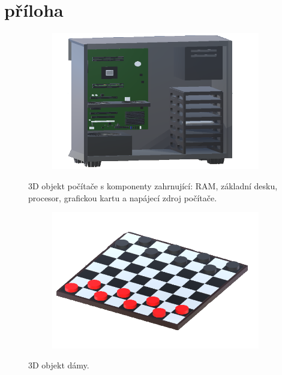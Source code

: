 \documentclass[12pt, a4paper,
twoside,        %
openright
]{report}
\begin{document}
[\vspace{-22pt}] %


\chapter*{příloha}
\begin{figure}[h!] \centering
	\begin{subfigure}[h]{0.63\textwidth}
		\includegraphics[width=\textwidth]{image/pc.png} 
	\end{subfigure}
	\caption[3D objekt počítače]{3D objekt počítače s komponenty zahrnující: RAM, základní desku, procesor, grafickou kartu a napájecí zdroj počítače.}
	\label{fig:pocitac}
	\begin{subfigure}[h]{0.63\textwidth}
		\includegraphics[width=\textwidth]{image/checkers.png}
	\end{subfigure}
	\caption[3D objekt dámy]{3D objekt dámy.}
	\label{fig:dama}
\end{figure}
\end{document}
